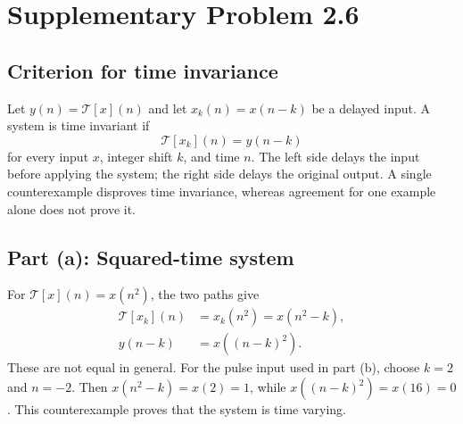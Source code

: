 \section{Supplementary Problem 2.6}
\subsection{Criterion for time invariance}
Let $y(n)=\mathcal{T}[x](n)$ and let $x_k(n)=x(n-k)$ be a delayed input.
A system is time invariant if
\begin{equation}
  \mathcal{T}[x_k](n)=y(n-k)
\end{equation}
for every input $x$, integer shift $k$, and time $n$. The left side
delays the input before applying the system; the right side delays the
original output. A single counterexample disproves time invariance,
whereas agreement for one example alone does not prove it.

\subsection{Part (a): Squared-time system}
For $\mathcal{T}[x](n)=x(n^2)$, the two paths give
\begin{align}
  \mathcal{T}[x_k](n)&=x_k(n^2)=x(n^2-k),\\
  y(n-k)&=x((n-k)^2).
\end{align}
These are not equal in general. For the pulse input used in part (b),
choose $k=2$ and $n=-2$. Then $x(n^2-k)=x(2)=1$, while
$x((n-k)^2)=x(16)=0$. This counterexample proves that the system
is time varying.

